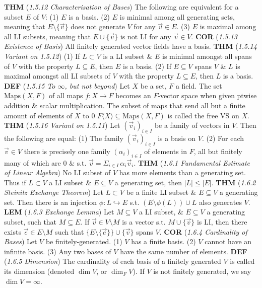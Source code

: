\documentclass{article}
\newcommand{\wde}[1]{\textcolor{defc}{\textbf{DEF}} (\textcolor{namec}{\textit{#1}})}
\newcommand{\wl}[1]{\textcolor{lemc}{\textbf{LEM}} (\textcolor{namec}{\textit{#1}})}
\newcommand{\wc}[1]{\textcolor{corc}{\textbf{COR}} (\textcolor{namec}{\textit{#1}})}
\newcommand{\wt}[1]{\textcolor{thmc}{\textbf{THM}} (\textcolor{namec}{\textit{#1}})}
\newcommand{\Maps}[0]{\text{Maps}}
\begin{document}
\begin{multicols}{2}
  \wt{1.5.12 Characterisation of Bases} The following are equivalent for a subset $E$ of $V$:
  (1) $E$ is a basis.
  (2) $E$ is minimal among all generating sets, meaning that $E \setminus \{\vec{v}\}$ does not generate $V$ for any $\vec{v} \in E$.
  (3) $E$ is maximal among all LI subsets, meaning that $E \cup \{\vec{v}\}$ is not LI for any $\vec{v} \in V$.
  \wc{1.5.13 Existence of Basis} All finitely generated vector fields have a basis.
  \wt{1.5.14 Variant on 1.5.12}
  (1) If $L \subset V$ is a LI subset \& $E$ is minimal amongst all spans of $V$ with the property $L \subseteq E$, then $E$ is a basis.
  (2) If $E \subseteq V$ spans $V$ \& $L$ is maximal amongst all LI subsets of $V$ with the property $L \subseteq E$, then $L$ is a basis.
  \wde{1.5.15 To $\infty$, but not beyond} Let $X$ be a set, $F$ a field. The set $\Maps(X,F)$ of all maps $f : X \to F$ becomes an $F$-vector space when given ptwise addition \& scalar multiplication. The subset of maps that send all but a finite amount of elements of $X$ to 0 $F \langle X \rangle \subseteq \Maps(X, F)$ is called the free VS on $X$.
  \wt{1.5.16 Variant on 1.5.11} Let $(\vec{v}_{i})_{i \in I}$ be a family of vectors in $V$. Then the following are equal:
  (1) The family $(\vec{v}_{i})_{i \in I}$ is a basis on $V$.
  (2) For each $\vec{v} \in V$ there is precisely one family $(\alpha_{i})_{i \in I}$ of elements in $F$, all but finitely many of which are 0 \& s.t. $\vec{v} = \Sigma_{i \in I} \, \alpha_{i}\vec{v}_{i}$.
  \wt{1.6.1 Fundamental Estimate of Linear Algebra} No LI subset of $V$ has more elements than a generating set. Thus if $L \subset V$ a LI subset \& $E \subseteq V$ a generating set, then $|L| \le |E|$.
  \wt{1.6.2 Steinitz Exchange Theorem} Let $L \subset V$ be a finite LI subset \& $E \subseteq V$ a generating set. Then there is an injection $\phi : L \hookrightarrow E$ s.t. $(E \setminus \phi(L)) \cup L$ also generates $V$.
  \wl{1.6.3 Exchange Lemma} Let $M \subseteq V$ a LI subset, \& $E \subseteq V$ a generating subset, such that $M \subseteq E$. If $\vec{v} \in V \setminus M$ is a vector s.t. $M \cup \{\vec{v}\}$ is LI, then there exists $\vec{e} \in E \setminus M$ such that $\{E \setminus \{\vec{e}\}\} \cup \{\vec{v}\}$ spans $V$.
  \wc{1.6.4 Cardinality of Bases} Let $V$ be finitely-generated.
  (1) $V$ has a finite basis.
  (2) $V$ cannot have an infinite basis.
  (3) Any two bases of $V$ have the same number of elements.
  \wde{1.6.5 Dimension} The cardinality of each basis of a finitely generated $V$ is called its dimension (denoted $\dim V$, or $\dim_{F}V$). If $V$ is not finitely generated, we say $\dim V = \infty$.

\end{multicols}
\end{document}
